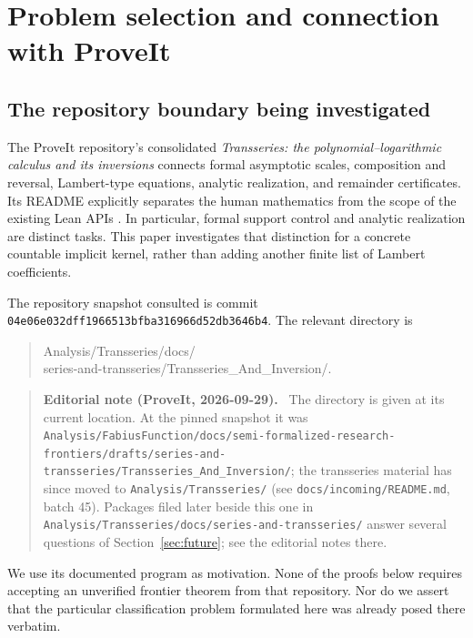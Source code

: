 \documentclass[11pt,a4paper]{article}
\numberwithin{equation}{section}
\theoremstyle{definition}
\theoremstyle{remark}
\newenvironment{ednote}{\par\smallskip\begin{quote}\small\raggedright\textbf{Editorial note (ProveIt, 2026-09-29).}\ }{\end{quote}\smallskip}
\begin{document}
\clearpage
\setcounter{tocdepth}{1}
\hypersetup{bookmarksdepth=2}
\tableofcontents
\clearpage

\section{Problem selection and connection with ProveIt}
\label{sec:context}

\subsection{The repository boundary being investigated}

The ProveIt repository's consolidated \emph{Transseries: the
polynomial--logarithmic calculus and its inversions} connects formal
asymptotic scales, composition and reversal, Lambert-type equations,
analytic realization, and remainder certificates.  Its README explicitly
separates the human mathematics from the scope of the existing Lean APIs
\cite{repo}.  In particular, formal support control and analytic realization
are distinct tasks.  This paper investigates that distinction for a concrete
countable implicit kernel, rather than adding another finite list of
Lambert coefficients.

The repository snapshot consulted is commit
\texttt{04e06e032dff1966513bfba316966d52db3646b4}.  The relevant directory is
\begin{quote}\small\ttfamily
Analysis/Transseries/docs/\\
series-and-transseries/Transseries\_And\_Inversion/.
\end{quote}
\begin{ednote}
The directory is given at its current location. At the pinned snapshot it was
\nolinkurl{Analysis/FabiusFunction/docs/semi-formalized-research-frontiers/drafts/series-and-transseries/Transseries_And_Inversion/};
the transseries material has since moved to \nolinkurl{Analysis/Transseries/}
(see \nolinkurl{docs/incoming/README.md}, batch 45). Packages filed later
beside this one in \nolinkurl{Analysis/Transseries/docs/series-and-transseries/}
answer several questions of Section~\ref{sec:future}; see the editorial notes there.
\end{ednote}
We use its documented program as motivation.  None of the proofs below
requires accepting an unverified frontier theorem from that repository.
Nor do we assert that the particular classification problem formulated here
was already posed there verbatim.
\end{document}
